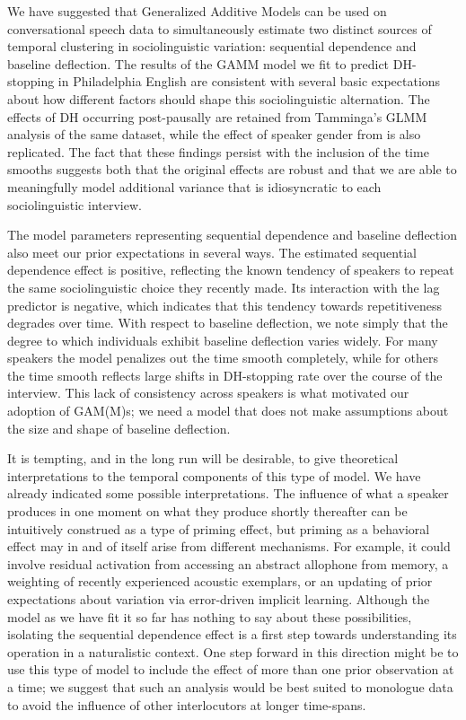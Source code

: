 \documentclass[12pt]{article}
\begin{document}
We have suggested that Generalized Additive Models can be used on conversational speech data to simultaneously estimate two distinct sources of temporal clustering in sociolinguistic variation: sequential dependence and baseline deflection. The results of the GAMM model we fit to predict DH-stopping in Philadelphia English are consistent with several basic expectations about how different factors should shape this sociolinguistic alternation. The effects of DH occurring post-pausally are retained from Tamminga's \citeyearpar{Tamminga:2014b} GLMM analysis of the same dataset, while the effect of speaker gender from \citet{Labov:2001} is also replicated. The fact that these findings persist with the inclusion of the time smooths suggests both that the original effects are robust and that we are able to meaningfully model additional variance that is idiosyncratic to each sociolinguistic interview.


The model parameters representing sequential dependence and baseline deflection also meet our prior expectations in several ways. The estimated sequential dependence effect is positive,  reflecting the known tendency of speakers to repeat the same sociolinguistic choice they recently made. Its interaction with the lag predictor is negative, which indicates that this tendency towards repetitiveness degrades over time.
With respect to baseline deflection, we note simply that the degree to which individuals exhibit baseline deflection varies widely. For many speakers the model penalizes out the time smooth completely, while for others the time smooth reflects large shifts in DH-stopping rate over the course of the interview. This lack of consistency across speakers is what motivated our adoption of GAM(M)s; we need a model that does not make assumptions about the size and shape of baseline deflection. 

It is tempting, and in the long run will be desirable, to give theoretical interpretations to the temporal components of this type of model. We have already indicated some possible interpretations. The influence of what a speaker produces in one moment on what they produce shortly thereafter can be intuitively construed as a type of priming effect, but priming as a behavioral effect may in and of itself  arise from different mechanisms. For example, it could involve residual activation from accessing an abstract allophone from memory, a weighting of recently experienced acoustic exemplars, or an updating of prior expectations about variation via error-driven implicit learning. Although the model as we have fit it so far has nothing to say about these possibilities, isolating the sequential dependence effect is a first step towards understanding its operation in a naturalistic context. One step forward in this direction might be to use this type of model to include the effect of more than one prior observation at a time; we suggest that such an analysis would be best suited to monologue data to avoid the influence of other interlocutors at longer time-spans.
\end{document}
